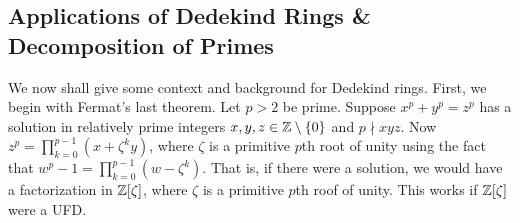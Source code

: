 \newpage
\subsection{Applications of Dedekind Rings \& Decomposition of Primes\label{sec:620_7}}

We now shall give some context and background for Dedekind rings. First, we begin with Fermat's last theorem. Let $p>2$ be prime. Suppose $x^p+y^p=z^p$ has a solution in relatively prime integers $x,y,z \in \mathbb{Z} \setminus \{0\}$ and $p \nmid xyz$. Now $z^p=\prod_{k=0}^{p-1} (x+ \zeta^k y)$, where $\zeta$ is a primitive $p$th root of unity using the fact that $w^p-1 = \prod_{k=0}^{p-1} (w- \zeta^k)$. That is, if there were a solution, we would have a factorization in $\mathbb{Z}[\zeta]$, where $\zeta$ is a primitive $p$th roof of unity. This works if $\mathbb{Z}[\zeta]$ were a UFD.

